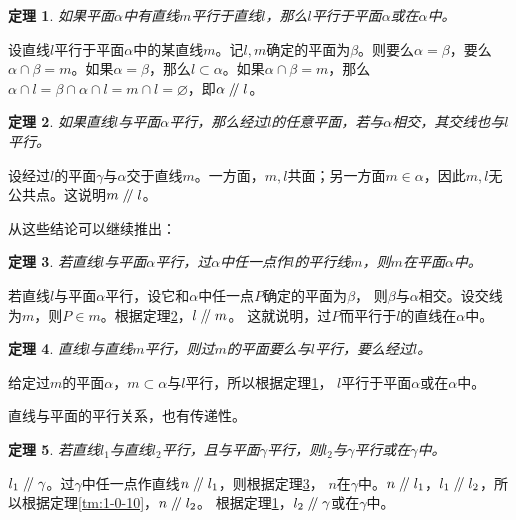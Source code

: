 \documentclass[12pt,UTF8]{ctexbook}
\newtheorem{tm}{定理}[section]
\renewcommand\parallel{\mathrel{/\mskip-4mu/}}
\begin{document}
\begin{tm}\label{tm:1-0-20}
    如果平面$\alpha$中有直线$m$平行于直线$l$，那么$l$平行于平面$\alpha$或在$\alpha$中。
\end{tm}
\begin{proof2}
    设直线$l$平行于平面$\alpha$中的某直线$m$。记$l,m$确定的平面为$\beta$。则要么$\alpha = \beta$，要么$\alpha\cap\beta = m$。如果$\alpha=\beta$，那么$l\subset\alpha$。如果$\alpha\cap\beta = m$，那么$\alpha\cap l= \beta\cap \alpha\cap l = m\cap l = \varnothing $，即$\alpha \parallel l$。
\end{proof2}
\begin{tm}\label{tm:1-0-30}
    如果直线$l$与平面$\alpha$平行，那么经过$l$的任意平面，若与$\alpha$相交，其交线也与$l$平行。
\end{tm}
\begin{proof2}
    设经过$l$的平面$\gamma$与$\alpha$交于直线$m$。一方面，$m,l$共面；另一方面$m\in\alpha$，因此$m,l$无公共点。这说明$m\parallel l$。
\end{proof2}
从这些结论可以继续推出：
\begin{tm}\label{tm:1-0-40}
    若直线$l$与平面$\alpha$平行，过$\alpha$中任一点作$l$的平行线$m$，则$m$在平面$\alpha$中。
\end{tm}
\begin{proof2}
    若直线$l$与平面$\alpha$平行，设它和$\alpha$中任一点$P$确定的平面为$\beta$，
    则$\beta$与$\alpha$相交。设交线为$m$，则$P\in m$。根据定理\ref{tm:1-0-30}，$l\parallel m$。
    这就说明，过$P$而平行于$l$的直线在$\alpha$中。
\end{proof2}
\begin{tm}\label{tm:1-0-41}
    直线$l$与直线$m$平行，则过$m$的平面要么与$l$平行，要么经过$l$。
\end{tm}
\begin{proof2}
    给定过$m$的平面$\alpha$，$m\subset \alpha$与$l$平行，所以根据定理\ref{tm:1-0-20}，
    $l$平行于平面$\alpha$或在$\alpha$中。
\end{proof2}

直线与平面的平行关系，也有传递性。
\begin{tm}
    若直线$l_1$与直线$l_2$平行，且与平面$\gamma$平行，则$l_2$与$\gamma$平行或在$\gamma$中。
\end{tm}
\begin{proof2}
    $l_1\parallel \gamma$。过$\gamma$中任一点作直线$n\parallel l_1$，则根据定理\ref{tm:1-0-40}，
    $n$在$\gamma$中。$n\parallel l_1$，$l_1\parallel l_2$，所以根据定理\ref{tm:1-0-10}，$n\parallel l_2$。
    根据定理\ref{tm:1-0-20}，$l_2\parallel \gamma$或在$\gamma$中。
\end{proof2}
\end{document}
